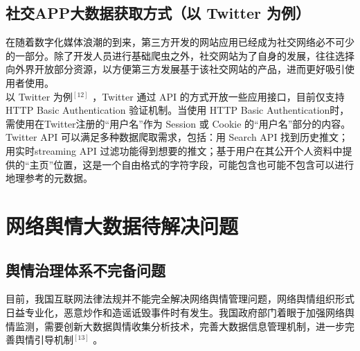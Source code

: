 \documentclass[11pt,a4paper,utf8]{article}
\begin{document}

\subsection{社交APP大数据获取方式（以 Twitter 为例）}
在随着数字化媒体浪潮的到来，第三方开发的网站应用已经成为社交网络必不可少的一部分。除了开发人员进行基础爬虫之外，社交网站为了自身的发展，往往选择向外界开放部分资源，以方便第三方发展基于该社交网站的产品，进而更好吸引使用者使用。\\

以 Twitter 为例$^{[12]}$ ，Twitter 通过 API 的方式开放一些应用接口，目前仅支持 HTTP Basic Authentication 验证机制。当使用 HTTP Basic Authentication时，需使用在Twitter注册的“用户名”作为 Session 或 Cookie 的“用户名”部分的内容。\\

Twitter API 可以满足多种数据爬取需求，包括：用 Search API 找到历史推文；用实时streaming API 过滤功能得到想要的推文；基于用户在其公开个人资料中提供的“主页”位置，这是一个自由格式的字符字段，可能包含也可能不包含可以进行地理参考的元数据。
 

 
\section{网络舆情大数据待解决问题}
{\color{red}{以下部分由王红阳书写整理}} 

\subsection{舆情治理体系不完备问题}
目前，我国互联网法律法规并不能完全解决网络舆情管理问题，网络舆情组织形式日益专业化，恶意炒作和造谣诋毁事件时有发生。我国政府部门着眼于加强网络舆情监测，需要创新大数据舆情收集分析技术，完善大数据信息管理机制，进一步完善舆情引导机制$^{[13]}$ 。
\end{document}
